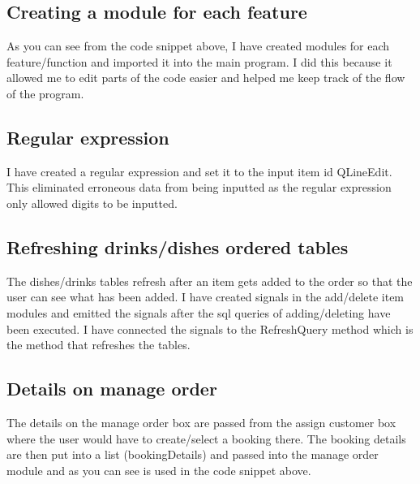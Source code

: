\subsection{Creating a module for each feature}
\begin{figure}[H]
\end{figure}
As you can see from the code snippet above, I have created modules for each feature/function and imported it into the main program. I did this because it allowed me to edit parts of the code easier and helped me keep track of the flow of the program.

\subsection{Regular expression}
\begin{figure}[H]
\end{figure}
I have created a regular expression and set it to the input item id QLineEdit. This eliminated erroneous data from being inputted as the regular expression only allowed digits to be inputted.

\subsection{Refreshing drinks/dishes ordered tables}
\begin{figure}[H]
\end{figure}
The dishes/drinks tables refresh after an item gets added to the order so that the user can see what has been added. I have created signals in the add/delete item modules  and emitted the signals after the sql queries of adding/deleting have been executed. I have connected the signals to the RefreshQuery method which is the method that refreshes the tables.

\subsection{Details on manage order}
\begin{figure}[H]
\end{figure}
The details on the manage order box are passed from the assign customer box where the user would have to create/select a booking there. The booking details are then put into a list (bookingDetails) and passed into the manage order module and as you can see is used in the code snippet above.

